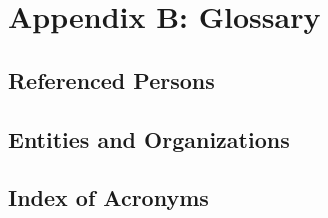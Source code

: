 \section{Appendix B: Glossary}

\subsection{Referenced Persons}

\subsection{Entities and Organizations}

\subsection{Index of Acronyms}
